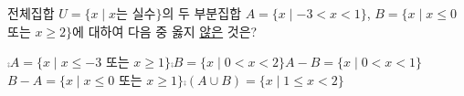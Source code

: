 전체집합 $U=\{x \mid x$는 실수$\}$의 두 부분집합 $A=\{x \mid -3<x<1\}$, $B=\{x \mid x\le 0$ 또는 $x\ge 2\}$에 대하여 다음 중 옳지 \underline{않은} 것은?
\begin{choicesv}{$\comp{A}=\{x \mid x\le -3$ 또는 $x\ge 1\}$}{$\comp{B}=\{x \mid 0<x<2\}$}{$A-B=\{x \mid 0<x<1\}$}{$B-A=\{x \mid x\le 0$ 또는 $x\ge 1\}$}{$\comp{(A\cup B)}=\{x \mid 1\le x<2\}$}\end{choicesv}

